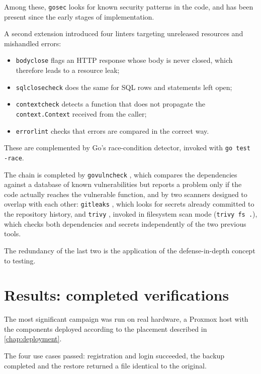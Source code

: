 Among these, \texttt{gosec} \cite{gosec} looks for known security patterns in the code, and has been present since the
early stages of implementation.

A second extension introduced four linters targeting unreleased resources and mishandled errors:

\begin{itemize}
    \item \texttt{bodyclose} \cite{bodyclose} flags an HTTP response whose body is never
    closed, which therefore leads to a resource leak;
    \item \texttt{sqlclosecheck} \cite{sqlclosecheck} does the same for SQL rows and statements left
    open;
    \item \texttt{contextcheck} \cite{contextcheck} detects a function that does not propagate the
    \texttt{context.Context} received from the caller;
    \item \texttt{errorlint} \cite{errorlint} checks that errors are compared in the
    correct way.
\end{itemize}

These are complemented by Go's race-condition detector, invoked with \texttt{go test -race}.

The chain is completed by \texttt{govulncheck} \cite{govulncheck}, which compares the dependencies against a database
of known vulnerabilities but reports a problem only if the code actually reaches the vulnerable function,
and by two scanners designed to overlap with each other:
\texttt{gitleaks} \cite{gitleaks}, which looks for secrets already committed to the repository history, and
\texttt{trivy} \cite{trivy}, invoked in filesystem scan mode (\texttt{trivy fs .}), which
checks both dependencies and secrets independently of the two previous tools.

The redundancy of the last two is the application of the defense-in-depth concept to testing.

\section{Results: completed verifications}

The most significant campaign was run on real hardware, a Proxmox host with the components
deployed according to the placement described in \autoref{chap:deployment}.

The four use cases passed: registration and login succeeded, the backup completed and the
restore returned a file identical to the original.

